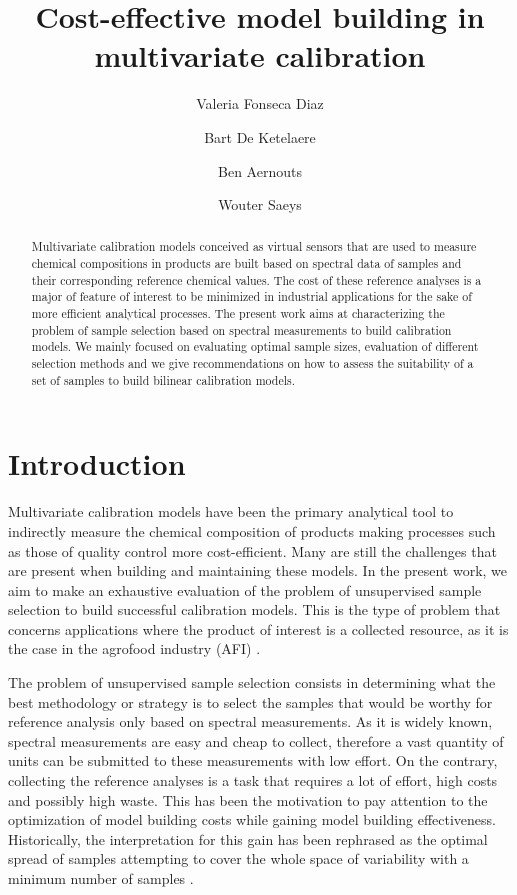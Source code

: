 \documentclass[journal=ancham,manuscript=article]{achemso}
\author{Valeria Fonseca Diaz}
\author{Bart De Ketelaere}
\author{Ben Aernouts}
\author{Wouter Saeys}
\affiliation[KU Leuven]
{KU Leuven, Kasteelpark
Arenberg 30, Leuven, Belgium}
\title[An \textsf{achemso} demo]
  {Cost-effective model building in multivariate calibration}
\begin{document}
\begin{abstract}
Multivariate calibration models conceived as virtual sensors that are used to measure chemical compositions in products are built based on spectral data of samples and their corresponding reference chemical values. The cost of these reference analyses is a major of feature of interest to be minimized in industrial applications for the sake of more efficient analytical processes. The present work aims at characterizing the problem of sample selection based on spectral measurements to build calibration models. We mainly focused on evaluating optimal sample sizes, evaluation of different selection methods and we give recommendations on how to assess the suitability of a set of samples to build bilinear calibration models.
\end{abstract}%


\section*{Introduction}\label{introduction}

Multivariate calibration models have been the primary analytical tool to indirectly measure the chemical composition of products making processes such as those of quality control more cost-efficient. Many are still the challenges that are present when building and maintaining these models. In the present work, we aim to make an exhaustive evaluation of the problem of unsupervised sample selection to build successful calibration models. This is the type of problem that concerns applications where the product of interest is a collected resource, as it is the case in the agrofood industry (AFI) \cite{Au2020,Diaz-Olivares2020, Saeys2005, Bobelyn2010}.  

The problem of unsupervised sample selection consists in determining what the best methodology or strategy is to select the samples that would be worthy for reference analysis only based on spectral measurements. As it is widely known, spectral measurements are easy and cheap to collect, therefore a vast quantity of units can be submitted to these measurements with low effort. On the contrary, collecting the reference analyses is a task that requires a lot of effort, high costs and possibly high waste. This has been the motivation to pay attention to the optimization of model building costs while gaining model building effectiveness. Historically, the interpretation for this gain has been rephrased as the optimal spread of samples attempting to cover the whole space of variability with a minimum number of samples \cite{Naes1990, Saeys2019,Kennard1969}.
\end{document}
